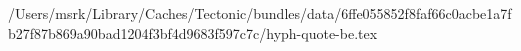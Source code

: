 /Users/msrk/Library/Caches/Tectonic/bundles/data/6ffe055852f8faf66c0acbe1a7fb27f87b869a90bad1204f3bf4d9683f597c7c/hyph-quote-be.tex
